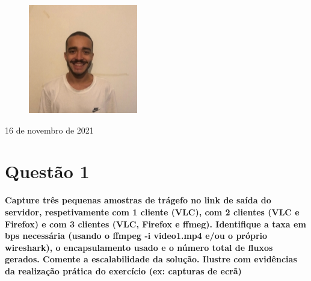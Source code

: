 \documentclass[a4paper, 11pt]{article}
\begin{document}
\begin{titlepage}
\begin{center}
\begin{figure}[!htb]
            \centering
            \captionsetup{pg47488}
        \endminipage
        \hspace{-0.2cm}
            \includegraphics[width=\linewidth]{images/Capa/154.jpg} 
            \centering
            \captionsetup{pg47577}
        \endminipage
    \end{figure}

\blindtext

\vspace{2cm}
        
        16 de novembro de 2021
            
    \end{center}
\end{titlepage}

\newpage
\tableofcontents
\newpage

\section {Questão 1} 
\textbf{Capture três pequenas amostras de trágefo no link de saída do servidor, respetivamente com 1 cliente (VLC), com 2
clientes (VLC e Firefox) e com 3 clientes (VLC, Firefox e ffmeg). Identifique a taxa em bps necessária (usando o ffmpeg -i video1.mp4
e/ou o próprio wireshark), o encapsulamento usado e o número total de fluxos gerados. Comente a escalabilidade da solução.
Ilustre com evidências da realização prática do exercício (ex: capturas de ecrã)}
\vspace{0.25cm}
\end{document}
